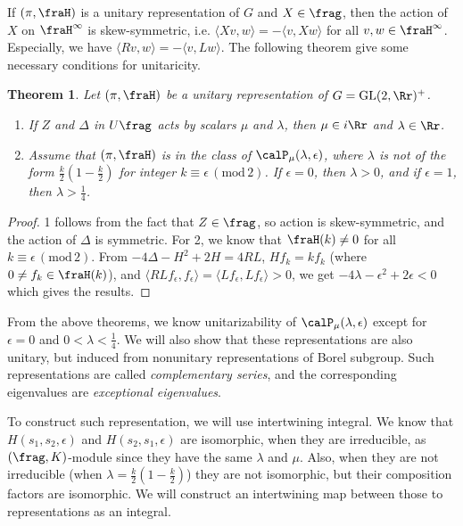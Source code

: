 \documentclass{article}
\newtheorem{theorem}{Theorem}[section]
\newcommand{\GL}{\mathrm{GL}}
\newcommand{\Mod}[1]{\,(\mathrm{mod}\,#1)}
\begin{document}
If $(\pi, \fraH)$ is a unitary representation of $G$ and  $X\in \frag$, then the action of $X$ on $\fraH^{\infty}$ is skew-symmetric, i.e. $\langle Xv, w\rangle = -\langle v, Xw\rangle$ for all $v, w\in \fraH^{\infty}$.  
Especially, we have $\langle Rv, w\rangle = -\langle v, Lw\rangle$. 
The following theorem give some necessary conditions for unitaricity. 
\begin{theorem}
Let $(\pi, \fraH)$ be a unitary representation of $G = \GL(2, \Rr)^{+}$. 
\begin{enumerate}
\item If $Z$ and $\Delta$ in $U\frag$ acts by scalars $\mu$ and $\lambda$, then $\mu\in i\Rr$ and $\lambda\in \Rr$. 
\item Assume that $(\pi, \fraH)$ is in the class of $\calP_{\mu}(\lambda, \epsilon)$, where $\lambda$ is not of the form $\frac{k}{2}\left(1-\frac{k}{2}\right)$ for integer $k\equiv \epsilon\Mod{2}$. If $\epsilon = 0$, then $\lambda > 0$, and if $\epsilon = 1$, then $\lambda > \frac{1}{4}$. 
\end{enumerate}
\end{theorem}
\begin{proof}
1 follows from the fact that $Z\in \frag$, so action is skew-symmetric, and the action of $\Delta$ is symmetric. For 2, we know that $\fraH(k)\neq 0$ for all $k\equiv\epsilon\Mod{2}$. From $-4\Delta - H^{2} + 2H = 4RL$, $Hf_{k} = kf_{k}$ (where $0\neq f_{k}\in \fraH(k)$), and $\langle RL f_{\epsilon}, f_{\epsilon}\rangle = \langle Lf_{\epsilon}, Lf_{\epsilon}\rangle  >0$, we get $-4\lambda - \epsilon^{2} + 2\epsilon <0$ which gives the results. 
\end{proof}

From the above theorems, we know unitarizability of $\calP_{\mu}(\lambda, \epsilon)$ except for $\epsilon = 0$ and $0 < \lambda < \frac{1}{4}$. We will also show that these representations are also unitary, but induced from nonunitary representations of Borel subgroup. Such representations are called \emph{complementary series}, and the corresponding eigenvalues are \emph{exceptional eigenvalues}. 

To construct such representation, we will use intertwining integral. We know that $H(s_{1}, s_{2}, \epsilon)$ and $H(s_{2}, s_{1}, \epsilon)$ are isomorphic, when they are irreducible,  as $(\frag, K)$-module since they have the same $\lambda$ and $\mu$. 
Also, when they are not irreducible (when $\lambda = \frac{k}{2}\left(1-\frac{k}{2}\right)$) they are not isomorphic, but their composition factors are isomorphic. 
We will construct an intertwining map between those to representations as an integral. 
\end{document}
